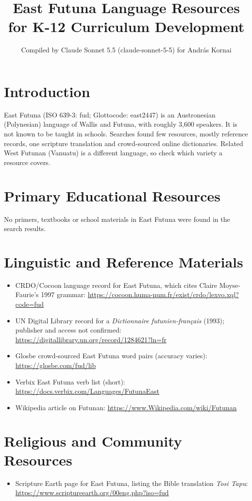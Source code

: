\documentclass[12pt]{article}
\title{East Futuna Language Resources for K-12 Curriculum Development}
\author{Compiled by Claude Sonnet 5.5 (claude-sonnet-5-5) for Andr\'as Kornai}
\date{}
\begin{document}
\maketitle

\section{Introduction}
East Futuna (ISO 639-3: fud; Glottocode: east2447) is an Austronesian (Polynesian) language of Wallis and Futuna, with roughly 3,600 speakers. It is not known to be taught in schools. Searches found few resources, mostly reference records, one scripture translation and crowd-sourced online dictionaries. Related West Futunan (Vanuatu) is a different language, so check which variety a resource covers.

\section{Primary Educational Resources}
No primers, textbooks or school materials in East Futuna were found in the search results.

\section{Linguistic and Reference Materials}
\begin{itemize}
\item CRDO/Cocoon language record for East Futuna, which cites Claire Moyse-Faurie's 1997 grammar: \url{https://cocoon.huma-num.fr/exist/crdo/lexvo.xql?code=fud}
\item UN Digital Library record for a \emph{Dictionnaire futunien-fran\c{c}ais} (1993); publisher and access not confirmed: \url{https://digitallibrary.un.org/record/1284621?ln=fr}
\item Glosbe crowd-sourced East Futuna word pairs (accuracy varies): \url{https://glosbe.com/fud/lib}
\item Verbix East Futuna verb list (short): \url{https://docs.verbix.com/Languages/FutunaEast}
\item Wikipedia article on Futunan: \url{https://www.Wikipedia.com/wiki/Futunan}
\end{itemize}

\section{Religious and Community Resources}
\begin{itemize}
\item Scripture Earth page for East Futuna, listing the Bible translation \emph{Tosi Tapu}: \url{https://www.scriptureearth.org/00eng.php?iso=fud}
\end{itemize}
\end{document}
